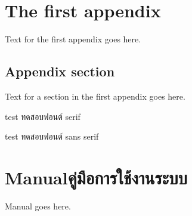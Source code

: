 \chapter{The first appendix}

Text for the first appendix goes here.

\section{Appendix section}

Text for a section in the first appendix goes here.

test ทดสอบฟอนต์ serif

\textsf{test ทดสอบฟอนต์ sans serif}

\ifenglish\else

\fi

\chapter{\ifenglish Manual\else คู่มือการใช้งานระบบ\fi}

Manual goes here.
